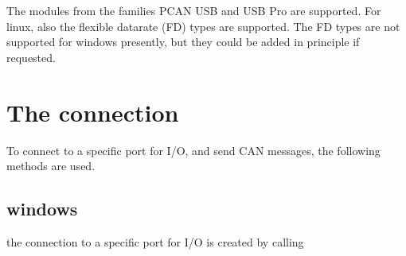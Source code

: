 \documentclass[letterpaper,10pt,english]{sphinxmanual}
\begin{document}
The modules from the families PCAN USB and USB Pro are supported. For linux, also the flexible
datarate (FD) types are supported. The FD types are not supported for windows presently, but they
could be added in principle if requested.


\section{The connection}
\label{\detokenize{vendors/peak:the-connection}}
To connect to a specific port for I/O, and send CAN messages, the following methods are used.


\subsection{windows}
\label{\detokenize{vendors/peak:windows}}
the connection to a specific port for I/O is created by calling
\end{document}
